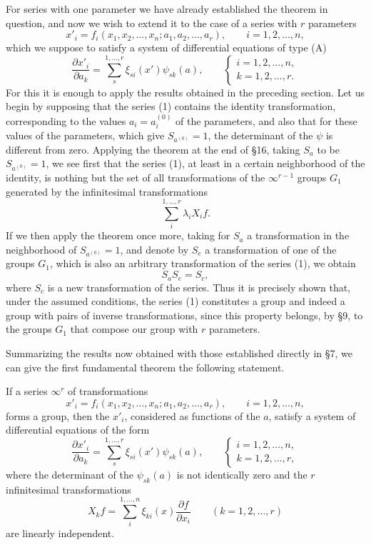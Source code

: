 \documentclass[11pt]{book}
\begin{document}
For series with one parameter we have already established the theorem in question, and now we wish to extend it to the case of a series with $r$ parameters
\begin{equation*}\tag{1}
 x'_i=f_i(x_1,x_2,\ldots,x_n; a_1,a_2,\ldots,a_r),\qquad i=1,2,\ldots,n,
\end{equation*}
which we suppose to satisfy a system of differential equations of type (A)
\begin{equation*}\tag{A}
 \frac{\partial x'_i}{\partial a_k}=\sum\limits_s^{1,\ldots,r}\xi_{si}(x')\psi_{sk}(a),
 \qquad
 \begin{cases}
 i=1,2,\ldots,n,\\
 k=1,2,\ldots,r.
 \end{cases}
\end{equation*}
For this it is enough to apply the results obtained in the preceding section. Let us begin by supposing that the series (1) contains the identity transformation, corresponding to the values $a_i=a_i^{(0)}$ of the parameters, and also that for these values of the parameters, which give $S_{a^{(0)}}=1$, the determinant of the $\psi$ is different from zero. Applying the theorem at the end of \S{}16, taking $S_a$ to be $S_{a^{(0)}}=1$, we see first that the series (1), at least in a certain neighborhood of the identity, is nothing but the set of all transformations of the $\infty^{r-1}$ groups $G_1$ generated by the infinitesimal transformations
\[
 \sum\limits_i^{1,\ldots,r} \lambda_i X_i f.
\]
If we then apply the theorem once more, taking for $S_a$ a transformation in the neighborhood of $S_{a^{(0)}}=1$, and denote by $S_e$ a transformation of one of the groups $G_1$, which is also an arbitrary transformation of the series (1), we obtain
\[
 S_aS_e=S_c,
\]
where $S_c$ is a new transformation of the series. Thus it is precisely shown that, under the assumed conditions, the series (1) constitutes a group and indeed a group with pairs of inverse transformations, since this property belongs, by \S{}9, to the groups $G_1$ that compose our group with $r$ parameters.

Summarizing the results now obtained with those established directly in \S{}7, we can give the first fundamental theorem the following statement.

If a series $\infty^r$ of transformations
\[
 x'_i=f_i(x_1,x_2,\ldots,x_n; a_1,a_2,\ldots,a_r),\qquad i=1,2,\ldots,n,
\]
forms a group, then the $x'_i$, considered as functions of the $a$, satisfy a system of differential equations of the form
\begin{equation*}\tag{A}
 \frac{\partial x'_i}{\partial a_k}=\sum\limits_s^{1,\ldots,r}\xi_{si}(x')\psi_{sk}(a),
 \qquad
 \begin{cases}
 i=1,2,\ldots,n,\\
 k=1,2,\ldots,r,
 \end{cases}
\end{equation*}
where the determinant of the $\psi_{sk}(a)$ is not identically zero and the $r$ infinitesimal transformations
\[
 X_kf=\sum\limits_i^{1,\ldots,n} \xi_{ki}(x)\frac{\partial f}{\partial x_i}\qquad (k=1,2,\ldots,r)
\]
are linearly independent.
\end{document}
